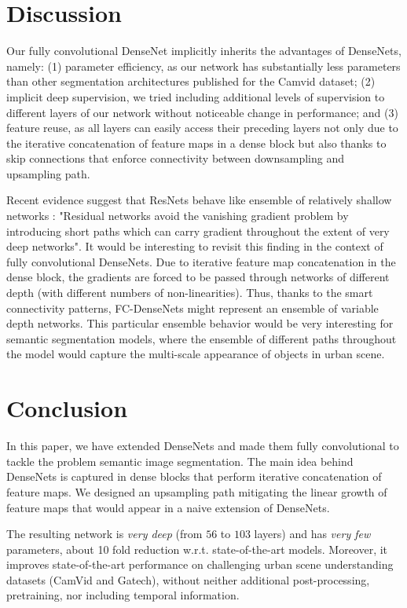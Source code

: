 \documentclass[10pt,twocolumn,letterpaper]{article}
\begin{document}
\section{Discussion}

Our fully convolutional DenseNet implicitly inherits the advantages of DenseNets, namely: (1) parameter efficiency, as our network has substantially less parameters than other segmentation architectures published for the Camvid dataset; (2) implicit deep supervision, we tried including additional levels of supervision to different layers of our network without noticeable change in performance; and (3) feature reuse, as all layers can easily access their preceding layers not only due to the iterative concatenation of feature maps in a dense block but also thanks to skip connections that enforce connectivity between downsampling and upsampling path.

Recent evidence suggest that ResNets behave like ensemble of relatively shallow networks \cite{VeitWB16}: "Residual networks avoid the vanishing gradient problem by introducing short paths which can carry gradient throughout the extent of very deep networks". It would be interesting to revisit this finding in the context of fully convolutional DenseNets. Due to iterative feature map concatenation in the dense block, the gradients are forced to be passed through networks of different depth (with different numbers of non-linearities). Thus, thanks to the smart connectivity patterns, FC-DenseNets might represent an ensemble of variable depth networks. This particular ensemble behavior would be very interesting for semantic segmentation models, where the ensemble of different paths throughout the model would capture the multi-scale appearance of objects in urban scene.


\section{Conclusion}
In this paper, we have extended DenseNets and made them fully convolutional to tackle the problem semantic image segmentation. The main idea behind DenseNets is captured in dense blocks that perform iterative concatenation of feature maps. We designed an upsampling path mitigating the linear growth of feature maps that would appear in a naive extension of DenseNets.

The resulting network is \emph{very deep} (from $56$ to $103$ layers) and has \emph{very few} parameters, about 10 fold reduction w.r.t. state-of-the-art models. Moreover, it improves state-of-the-art performance on challenging urban scene understanding datasets (CamVid and Gatech), without neither additional post-processing, pretraining, nor including temporal information.
\end{document}
